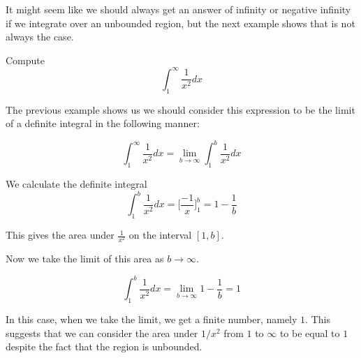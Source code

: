 \documentclass{ximera}
\begin{document}
It might seem like we should always get an answer of infinity or negative infinity if we integrate over an unbounded region, but the next example shows that is not always the case.

\begin{example}
Compute 
\[
\int_{1}^{\infty} \frac{1}{x^2} dx
\]

\begin{explanation}
The previous example shows us we should consider this expression to be the limit of a definite integral 
in the following manner:

\[
\int_{1}^{\infty} \frac{1}{x^2} dx=\lim_{b \to \infty} \int_{1}^{b} \frac{1}{x^2} dx
\]

We calculate the definite integral 
\[
\int_{1}^{b} \frac{1}{x^2} dx= \bigg[\frac{-1}{x}\bigg]_{1}^{b}=1-\frac{1}{b}
\]

This gives the area under $\frac{1}{x^2}$ on the interval $[1, b]$. 

\begin{image}
\end{image}

Now we take the limit of this area as $b \to \infty$. 

\[
\int_{1}^{b} \frac{1}{x^2} dx= \lim_{b \to \infty} 1-\frac{1}{b}=1
\]
  
In this case, when we take the limit, we get a finite number, namely $1$. This suggests that we can consider the 
area under $1/x^2$ from $1$ to $\infty$ to be equal to $1$ despite the fact that the region is unbounded. 



\end{explanation}
\end{example}
\end{document}
